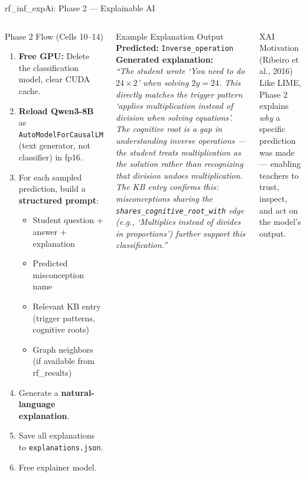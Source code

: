\documentclass[aspectratio=169]{beamer}
\begin{document}
\begin{frame}{rf\_inf\_expAi: Phase 2 --- Explainable AI}
\begin{columns}[T]
\begin{block}{Phase 2 Flow (Cells 10--14)}
\begin{enumerate}
  \item \textbf{Free GPU:} Delete the classification model, clear CUDA cache.
  \item \textbf{Reload Qwen3-8B} as \texttt{AutoModelForCausalLM} (text generator, not classifier) in fp16.
  \item For each sampled prediction, build a \textbf{structured prompt}:
  \begin{itemize}
    \item Student question + answer + explanation
    \item Predicted misconception name
    \item Relevant KB entry (trigger patterns, cognitive roots)
    \item Graph neighbors (if available from rf\_results)
  \end{itemize}
  \item Generate a \textbf{natural-language explanation}.
  \item Save all explanations to \texttt{explanations.json}.
  \item Free explainer model.
\end{enumerate}
\end{block}
\begin{exampleblock}{Example Explanation Output}
\scriptsize
\textbf{Predicted:} \texttt{Inverse\_operation}\\[4pt]
\textbf{Generated explanation:}\\
\textit{``The student wrote `You need to do $24 \times 2$' when solving $2y=24$. This directly matches the trigger pattern `applies multiplication instead of division when solving equations'. The cognitive root is a gap in understanding inverse operations --- the student treats multiplication as the solution rather than recognizing that division undoes multiplication. The KB entry confirms this: misconceptions sharing the \texttt{shares\_cognitive\_root\_with} edge (e.g., `Multiplies instead of divides in proportions') further support this classification.''}
\end{exampleblock}
\vspace{6pt}
\begin{block}{XAI Motivation (Ribeiro et al., 2016)}
Like LIME, Phase 2 explains \textit{why} a specific prediction was made --- enabling teachers to trust, inspect, and act on the model's output.
\end{block}
\end{columns}
\end{frame}
\end{document}
